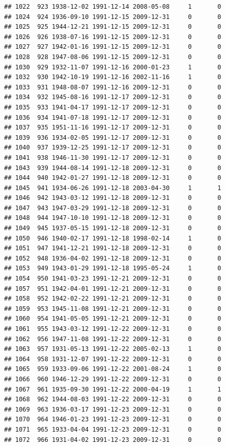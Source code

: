 \documentclass[
]{book}
\begin{document}
\begin{verbatim}
## 1022  923 1938-12-02 1991-12-14 2008-05-08     1       0
## 1024  924 1936-09-10 1991-12-15 2009-12-31     0       0
## 1025  925 1944-12-21 1991-12-15 2009-12-31     0       0
## 1026  926 1938-07-16 1991-12-15 2009-12-31     0       0
## 1027  927 1942-01-16 1991-12-15 2009-12-31     0       0
## 1028  928 1947-08-06 1991-12-15 2009-12-31     0       0
## 1030  929 1932-11-07 1991-12-16 2000-01-23     1       0
## 1032  930 1942-10-19 1991-12-16 2002-11-16     1       0
## 1033  931 1948-08-07 1991-12-16 2009-12-31     0       0
## 1034  932 1945-08-16 1991-12-17 2009-12-31     0       0
## 1035  933 1941-04-17 1991-12-17 2009-12-31     0       0
## 1036  934 1941-07-18 1991-12-17 2009-12-31     0       0
## 1037  935 1951-11-16 1991-12-17 2009-12-31     0       0
## 1039  936 1934-02-05 1991-12-17 2009-12-31     0       0
## 1040  937 1939-12-25 1991-12-17 2009-12-31     0       0
## 1041  938 1946-11-30 1991-12-17 2009-12-31     0       0
## 1043  939 1944-08-14 1991-12-18 2009-12-31     0       0
## 1044  940 1942-01-27 1991-12-18 2009-12-31     0       0
## 1045  941 1934-06-26 1991-12-18 2003-04-30     1       1
## 1046  942 1943-03-12 1991-12-18 2009-12-31     0       0
## 1047  943 1947-03-29 1991-12-18 2009-12-31     0       0
## 1048  944 1947-10-10 1991-12-18 2009-12-31     0       0
## 1049  945 1937-05-15 1991-12-18 2009-12-31     0       0
## 1050  946 1940-02-17 1991-12-18 1998-02-14     1       0
## 1051  947 1941-12-21 1991-12-18 2009-12-31     0       0
## 1052  948 1936-04-02 1991-12-18 2009-12-31     0       0
## 1053  949 1943-01-29 1991-12-18 1995-05-24     1       0
## 1054  950 1941-03-23 1991-12-21 2009-12-31     0       0
## 1057  951 1942-04-01 1991-12-21 2009-12-31     0       0
## 1058  952 1942-02-22 1991-12-21 2009-12-31     0       0
## 1059  953 1945-11-08 1991-12-21 2009-12-31     0       0
## 1060  954 1941-05-05 1991-12-21 2009-12-31     0       0
## 1061  955 1943-03-12 1991-12-22 2009-12-31     0       0
## 1062  956 1947-11-08 1991-12-22 2009-12-31     0       0
## 1063  957 1931-05-13 1991-12-22 2005-02-13     1       0
## 1064  958 1931-12-07 1991-12-22 2009-12-31     0       0
## 1065  959 1933-09-06 1991-12-22 2001-08-24     1       0
## 1066  960 1946-12-29 1991-12-22 2009-12-31     0       0
## 1067  961 1935-09-30 1991-12-22 2000-04-19     1       1
## 1068  962 1944-08-03 1991-12-22 2009-12-31     0       0
## 1069  963 1936-03-17 1991-12-23 2009-12-31     0       0
## 1070  964 1946-01-23 1991-12-23 2009-12-31     0       0
## 1071  965 1933-04-04 1991-12-23 2009-12-31     0       0
## 1072  966 1931-04-02 1991-12-23 2009-12-31     0       0

\end{verbatim}
\end{document}
